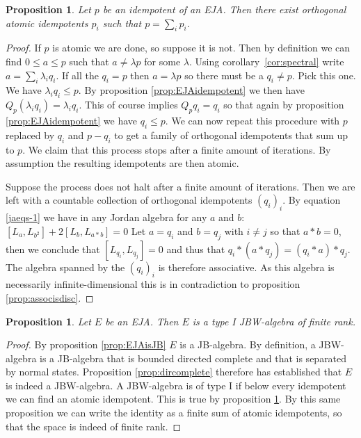 \documentclass[submission,copyright,creativecommons]{eptcs}
\newcounter{main}
\newtheorem{proposition}[main]{Proposition}
\theoremstyle{definition}
\begin{document}
\begin{proposition}\label{prop:atomicsum}
    Let $p$ be an idempotent of an EJA. Then there exist orthogonal atomic idempotents $p_i$ such that $p = \sum_i p_i$.
\end{proposition}
\begin{proof}
	If $p$ is atomic we are done, so suppose it is not. Then by definition we can find $0\leq a \leq p$ such that $a\neq \lambda p$ for some $\lambda$. Using corollary~\ref{cor:spectral} write $a=\sum_i \lambda_i q_i$. If all the $q_i = p$ then $a=\lambda p$ so there must be a $q_i\neq p$. Pick this one. We have $\lambda_i q_i \leq p$. By proposition \ref{prop:EJAidempotent} we then have $Q_p (\lambda_i q_i) = \lambda_i q_i$. This of course implies $Q_p q_i = q_i$ so that again by proposition \ref{prop:EJAidempotent} we have $q_i\leq p$. We can now repeat this procedure with $p$ replaced by $q_i$ and $p-q_i$ to get a family of orthogonal idempotents that sum up to $p$. We claim that this process stops after a finite amount of iterations. By assumption the resulting idempotents are then atomic.

    Suppose the process does not halt after a finite amount of iterations. Then we are left with a countable collection of orthogonal idempotents $(q_i)_i$. By equation \eqref{jaeqs-1} we have in any Jordan algebra for any $a$ and $b$: $[L_a,L_{b^2}] + 2[L_b, L_{a*b}] = 0$ Let $a=q_i$ and $b=q_j$ with $i\neq j$ so that $a*b=0$, then we conclude that $[L_{q_i},L_{q_j}] = 0$ and thus that $q_i*(a*q_j) = (q_i*a)*q_j$. The algebra spanned by the $(q_i)_i$ is therefore associative. As this algebra is necessarily infinite-dimensional this is in contradiction to proposition \ref{prop:associsdisc}.
\end{proof}

\begin{proposition}
    Let $E$ be an EJA. Then $E$ is a type I JBW-algebra of finite rank.
\end{proposition}
\begin{proof}
    By proposition \ref{prop:EJAisJB} $E$ is a JB-algebra. By definition, a JBW-algebra is a JB-algebra that is bounded directed complete and that is separated by normal states. Proposition \ref{prop:dircomplete} therefore has established that $E$ is indeed a JBW-algebra. A JBW-algebra is of type I if below every idempotent we can find an atomic idempotent. This is true by proposition \ref{prop:atomicsum}. By this same proposition we can write the identity as a finite sum of atomic idempotents, so that the space is indeed of finite rank.
\end{proof}
\end{document}
